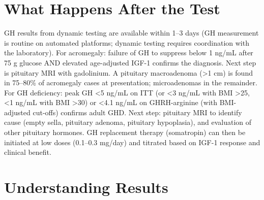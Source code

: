\section*{What Happens After the Test}
GH results from dynamic testing are available within 1--3 days (GH measurement is routine on automated platforms; dynamic testing requires coordination with the laboratory). For acromegaly: failure of GH to suppress below 1 ng/mL after 75 g glucose AND elevated age-adjusted IGF-1 confirms the diagnosis. Next step is pituitary MRI with gadolinium. A pituitary macroadenoma (>1 cm) is found in 75--80\% of acromegaly cases at presentation; microadenomas in the remainder. For GH deficiency: peak GH <5 ng/mL on ITT (or <3 ng/mL with BMI >25, <1 ng/mL with BMI >30) or <4.1 ng/mL on GHRH-arginine (with BMI-adjusted cut-offs) confirms adult GHD. Next step: pituitary MRI to identify cause (empty sella, pituitary adenoma, pituitary hypoplasia), and evaluation of other pituitary hormones. GH replacement therapy (somatropin) can then be initiated at low doses (0.1--0.3 mg/day) and titrated based on IGF-1 response and clinical benefit.

\section*{Understanding Results}

